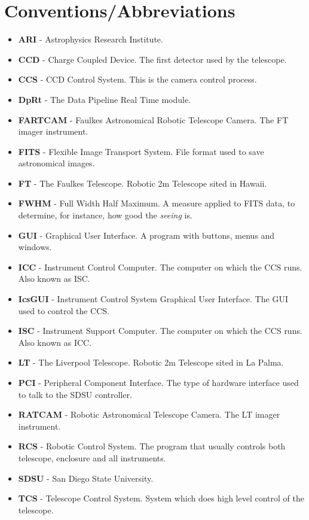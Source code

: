 \documentclass[10pt,a4paper]{article}
\begin{document}
\section{Conventions/Abbreviations}
\begin{itemize}
\item {\bf ARI} - Astrophysics Research Institute.
\item {\bf CCD} - Charge Coupled Device. The first detector used by the telescope.
\item {\bf CCS} - CCD Control System. This is the camera control process.
\item {\bf DpRt} - The Data Pipeline Real Time module.
\item {\bf FARTCAM} - Faulkes Astronomical Robotic Telescope Camera. The FT imager instrument.
\item {\bf FITS} - Flexible Image Transport System. File format used to save astronomical images.
\item {\bf FT} - The Faulkes Telescope. Robotic 2m Telescope sited in Hawaii.
\item {\bf FWHM} - Full Width Half Maximum. A measure applied to FITS data, to determine, for instance,
	how good the {\em seeing} is.
\item {\bf GUI} - Graphical User Interface. A program with buttons, menus and windows.
\item {\bf ICC} - Instrument Control Computer. The computer on which the CCS runs. Also known as ISC.
\item {\bf IcsGUI} - Instrument Control System Graphical User Interface. The GUI used to control the CCS.
\item {\bf ISC} - Instrument Support Computer. The computer on which the CCS runs. Also known as ICC.
\item {\bf LT} - The Liverpool Telescope. Robotic 2m Telescope sited in La Palma.
\item {\bf PCI} - Peripheral Component Interface. The type of hardware interface used to talk to the SDSU controller.
\item {\bf RATCAM} - Robotic Astronomical Telescope Camera. The LT imager instrument.
\item {\bf RCS} - Robotic Control System. The program that usually controls both telescope, enclosure and
	all instruments.
\item {\bf SDSU} - San Diego State University.
\item {\bf TCS} - Telescope Control System. System which does high level control of the telescope.
\end{itemize}
 
\end{document}
